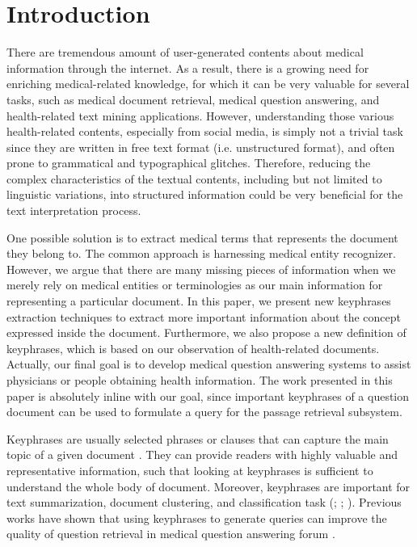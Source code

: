 \section{Introduction}

There are tremendous amount of user-generated contents about medical information through the internet. As a result, there is a growing need for enriching medical-related knowledge, for which it can be very valuable for several tasks, such as medical document retrieval, medical question answering, and health-related text mining applications. However, understanding those various health-related contents, especially from social media, is simply not a trivial task since they are written in free text format (i.e. unstructured format), and often prone to grammatical and typographical glitches. Therefore, reducing the complex characteristics of the textual contents, including but not limited to linguistic variations, into structured information could be very beneficial for the text interpretation process. 

One possible solution is to extract medical terms that represents the document they belong to. The common approach is harnessing medical entity recognizer. However, we argue that there are many missing pieces of information when we merely rely on medical entities or terminologies as our main information for representing a particular document. In this paper, we present new keyphrases extraction techniques to extract more important information about the concept expressed inside the document. Furthermore, we also propose a new definition of keyphrases, which is based on our observation of health-related documents. Actually, our final goal is to develop medical question answering systems to assist physicians or people obtaining health information. The work presented in this paper is absolutely inline with our goal, since important keyphrases of a question document can be used to formulate a query for the passage retrieval subsystem. 

Keyphrases are usually selected phrases or clauses that can capture the main topic of a given document \cite{turney2000learning}. They can provide readers with highly valuable and representative information, such that looking at keyphrases is sufficient to understand the whole body of document. Moreover, keyphrases are important for text summarization, document clustering, and classification task (\cite{classDocumentEkp1}; \cite{qaEkp}; \cite{gong2009improving}). Previous works have shown that using keyphrases to generate queries can improve the quality of question retrieval in medical question answering forum \cite{cao2010automatically}.


